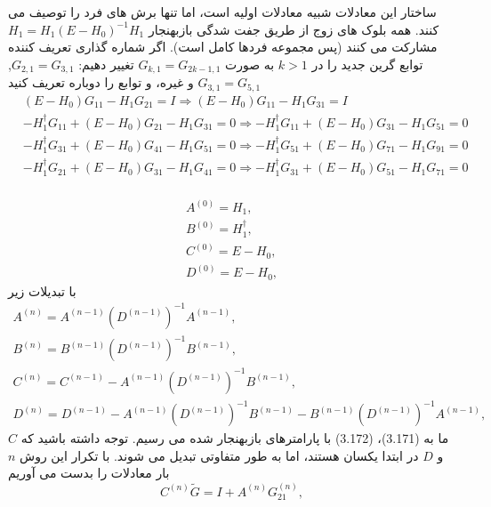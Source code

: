 ساختار این معادلات شبیه معادلات اولیه است، اما تنها برش های فرد را توصیف می کنند. همه بلوک های زوج از طریق جفت شدگی بازبهنجار $H_1 = H_1 (E - H_0)^{-1}H_{1}$ مشارکت می کنند (پس مجموعه فردها کامل است). اگر شماره گذاری تعریف کننده توابع گرین جدید را در $k > 1$ به صورت $G_{k,1}= G_{2k-1,1}$ تغییر دهیم: $G_{2,1} = G_{3,1}$, $G_{3,1} = G_{5,1}$ و غیره، و توابع را دوباره تعریف کنید
\begin{equation}
    \begin{aligned}
        & \left( E-{{H}_{0}} \right){{G}_{11}}-{{H}_{1}}{{G}_{21}}=I\Rightarrow \left( E-{{H}_{0}} \right){{G}_{11}}-{{H}_{1}}{{G}_{31}}=I \\ 
       & -H_{1}^{\dagger }{{G}_{11}}+\left( E-{{H}_{0}} \right){{G}_{21}}-{{H}_{1}}{{G}_{31}}=0\Rightarrow -H_{1}^{\dagger }{{G}_{11}}+\left( E-{{H}_{0}} \right){{G}_{31}}-{{H}_{1}}{{G}_{51}}=0 \\ 
       & -H_{1}^{\dagger }{{G}_{31}}+\left( E-{{H}_{0}} \right){{G}_{41}}-{{H}_{1}}{{G}_{51}}=0\Rightarrow -H_{1}^{\dagger }{{G}_{51}}+\left( E-{{H}_{0}} \right){{G}_{71}}-{{H}_{1}}{{G}_{91}}=0 \\ 
       & -H_{1}^{\dagger }{{G}_{21}}+\left( E-{{H}_{0}} \right){{G}_{31}}-{{H}_{1}}{{G}_{41}}=0\Rightarrow -H_{1}^{\dagger }{{G}_{31}}+\left( E-{{H}_{0}} \right){{G}_{51}}-{{H}_{1}}{{G}_{71}}=0 \\ 
      \end{aligned}
\end{equation}

\begin{equation}
    \begin{aligned}
        {{A}^{(0)}}={{H}_{1}},\\
        {{B}^{(0)}}=H_{1}^{\dagger},\\
        {{C}^{(0)}}=E-{{H}_{0}},\\
        {{D}^{(0)}}=E-{{H}_{0}},
    \end{aligned}
\end{equation}
با تبدیلات زیر
\begin{equation}
    \begin{aligned}
        {{A}^{(n)}}={{A}^{(n-1)}}{{({{D}^{(n-1)}})}^{-1}}{{A}^{(n-1)}},\\
        {{B}^{(n)}}={{B}^{(n-1)}}{{({{D}^{(n-1)}})}^{-1}}{{B}^{(n-1)}},\\
        {{C}^{(n)}}={{C}^{(n-1)}}-{{A}^{(n-1)}}{{({{D}^{(n-1)}})}^{-1}}{{B}^{(n-1)}},\\
        {{D}^{(n)}}={{D}^{(n-1)}}-{{A}^{(n-1)}}{{({{D}^{(n-1)}})}^{-1}}{{B}^{(n-1)}}-{{B}^{(n-1)}}{{({{D}^{(n-1)}})}^{-1}}{{A}^{(n-1)}},
    \end{aligned}
\end{equation}
ما به (3.171)، (3.172) با پارامترهای بازبهنجار شده می رسیم. توجه داشته باشید که $C$ و $D$ در ابتدا یکسان هستند، اما به طور متفاوتی تبدیل می شوند. با تکرار این روش $n$ بار معادلات را بدست می آوریم
\begin{equation}
    {{C}^{(n)}}\tilde{G}=I+{{A}^{(n)}}G_{21}^{(n)},
\end{equation}

